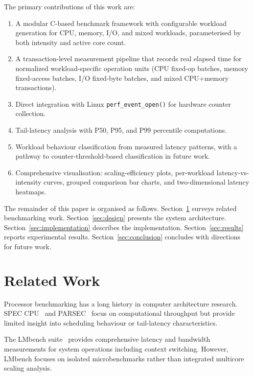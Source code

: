 \documentclass[conference]{IEEEtran}
\begin{document}
The primary contributions of this work are:
\begin{enumerate}
  \item A modular C-based benchmark framework with configurable workload
        generation for CPU, memory, I/O, and mixed workloads, parameterised by
        both intensity and active core count.
  \item A transaction-level measurement pipeline that records real elapsed
        time for normalized workload-specific operation units (CPU fixed-op
        batches, memory fixed-access batches, I/O fixed-byte batches, and
        mixed CPU+memory transactions).
  \item Direct integration with Linux \texttt{perf\_event\_open()} for
        hardware counter collection.
  \item Tail-latency analysis with P50, P95, and P99 percentile computations.
  \item Workload behaviour classification from measured latency patterns, with
        a pathway to counter-threshold-based classification in future work.
  \item Comprehensive visualisation: scaling-efficiency plots, per-workload
        latency-vs-intensity curves, grouped comparison bar charts, and
        two-dimensional latency heatmaps.
\end{enumerate}

The remainder of this paper is organised as follows.
Section~\ref{sec:related} surveys related benchmarking work.
Section~\ref{sec:design} presents the system architecture.
Section~\ref{sec:implementation} describes the implementation.
Section~\ref{sec:results} reports experimental results.
Section~\ref{sec:conclusion} concludes with directions for future work.

\section{Related Work}
\label{sec:related}

Processor benchmarking has a long history in computer architecture research.
SPEC CPU~\cite{spec2017} and PARSEC~\cite{bienia2011parsec} focus on
computational throughput but provide limited insight into scheduling behaviour
or tail-latency characteristics.

The LMbench suite~\cite{mcvoy1996lmbench} provides comprehensive latency
and bandwidth measurements for system operations including context switching.
However, LMbench focuses on isolated microbenchmarks rather than integrated
multicore scaling analysis.
\end{document}
